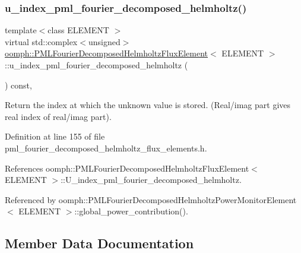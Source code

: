 \subsubsection{\texorpdfstring{u\+\_\+index\+\_\+pml\+\_\+fourier\+\_\+decomposed\+\_\+helmholtz()}{u\_index\_pml\_fourier\_decomposed\_helmholtz()}}
{\footnotesize\ttfamily template$<$class E\+L\+E\+M\+E\+NT $>$ \\
virtual std\+::complex$<$unsigned$>$ \hyperlink{classoomph_1_1PMLFourierDecomposedHelmholtzFluxElement}{oomph\+::\+P\+M\+L\+Fourier\+Decomposed\+Helmholtz\+Flux\+Element}$<$ E\+L\+E\+M\+E\+NT $>$\+::u\+\_\+index\+\_\+pml\+\_\+fourier\+\_\+decomposed\+\_\+helmholtz (\begin{DoxyParamCaption}{ }\end{DoxyParamCaption}) const\hspace{0.3cm}{\ttfamily [inline]}, {\ttfamily [virtual]}}



Return the index at which the unknown value is stored. (Real/imag part gives real index of real/imag part). 



Definition at line 155 of file pml\+\_\+fourier\+\_\+decomposed\+\_\+helmholtz\+\_\+flux\+\_\+elements.\+h.



References oomph\+::\+P\+M\+L\+Fourier\+Decomposed\+Helmholtz\+Flux\+Element$<$ E\+L\+E\+M\+E\+N\+T $>$\+::\+U\+\_\+index\+\_\+pml\+\_\+fourier\+\_\+decomposed\+\_\+helmholtz.



Referenced by oomph\+::\+P\+M\+L\+Fourier\+Decomposed\+Helmholtz\+Power\+Monitor\+Element$<$ E\+L\+E\+M\+E\+N\+T $>$\+::global\+\_\+power\+\_\+contribution().



\subsection{Member Data Documentation}
\mbox{\label{classoomph_1_1PMLFourierDecomposedHelmholtzFluxElement_ac55988a86c387ecfdff38e54a683a7a3}} 
